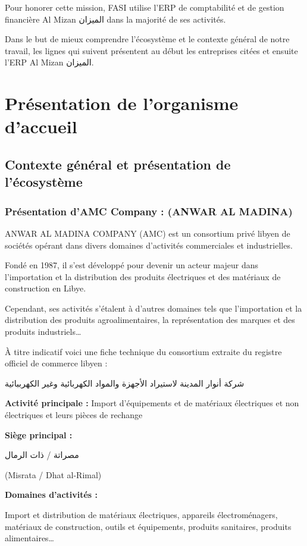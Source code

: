 \documentclass[a4paper,12pt]{report}
\begin{document}
Pour honorer cette mission, FASI utilise l'ERP de comptabilité et de gestion financière Al Mizan \textarabic{الميزان} dans la majorité de ses activités.

Dans le but de mieux comprendre l'écosystème et le contexte général de notre travail, les lignes qui suivent présentent au début les entreprises citées et ensuite l'ERP Al Mizan \textarabic{الميزان}.

\section{Présentation de l'organisme d'accueil}

\subsection{Contexte général et présentation de l'écosystème}

\subsubsection{Présentation d'AMC Company : (ANWAR AL MADINA)}

ANWAR AL MADINA COMPANY (AMC) est un consortium privé libyen de sociétés opérant dans divers domaines d'activités commerciales et industrielles.

Fondé en 1987, il s'est développé pour devenir un acteur majeur dans l'importation et la distribution des produits électriques et des matériaux de construction en Libye.

Cependant, ses activités s'étalent à d'autres domaines tels que l'importation et la distribution des produits agroalimentaires, la représentation des marques et des produits industriels…

À titre indicatif voici une fiche technique du consortium extraite du registre officiel de commerce libyen :

\begin{tcolorbox}[colback=fieldcolor, colframe=headercolor, boxrule=2pt, arc=4pt, left=10pt, right=10pt, top=10pt, bottom=10pt]
\begin{Arabic}
    شركة أنوار المدينة لاستيراد الأجهزة والمواد الكهربائية وغير الكهرببائية
\end{Arabic}

\textbf{Activité principale :} Import d'équipements et de matériaux électriques et non électriques et leurs pièces de rechange

\textbf{Siège principal :}
\begin{Arabic}
مصراتة / ذات الرمال
\end{Arabic}
(Misrata / Dhat al-Rimal)

\textbf{Domaines d'activités :}

Import et distribution de matériaux électriques, appareils électroménagers, matériaux de construction, outils et équipements, produits sanitaires, produits alimentaires…
\end{tcolorbox}
\end{document}
